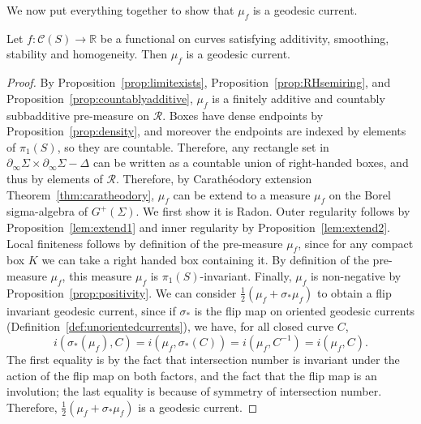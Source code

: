 We now put everything together to show that $\mu_f$ is a geodesic current.

\begin{proposition}
Let $f \colon \mathcal{C}(S) \to \mathbb{R}$ be a functional on curves satisfying additivity, smoothing, stability and homogeneity.
Then $\mu_f$ is a geodesic current.
\end{proposition}
\begin{proof}
By Proposition~\ref{prop:limitexists}, Proposition~\ref{prop:RHsemiring}, and Proposition~\ref{prop:countablyadditive}, $\mu_f$ is a finitely additive and countably subbadditive pre-measure on $\mathcal{R}$. Boxes have dense endpoints by Proposition~\ref{prop:density}, and moreover the endpoints are indexed by elements of $\pi_1(S)$, so they are countable. Therefore, any rectangle set in $\partial_{\infty}\Sigma \times \partial_{\infty} \Sigma-\Delta$ can be written as a countable union of right-handed boxes, and thus by elements of $\mathcal{R}$.
Therefore, by Carathéodory extension Theorem~\ref{thm:caratheodory}, $\mu_f$ can be extend to a measure $\mu_f$ on the Borel sigma-algebra of $G^+(\Sigma)$.
We first show it is Radon. 
Outer regularity follows by Proposition~\ref{lem:extend1} and inner regularity by Proposition~\ref{lem:extend2}.
Local finiteness follows by definition of the pre-measure $\mu_f$, since for any compact box $K$ we can take a right handed box containing it.
By definition of the pre-measure $\mu_f$, this measure $\mu_f$ is $\pi_1(S)$-invariant. Finally, $\mu_f$ is non-negative by Proposition~\ref{prop:positivity}.
We can consider $\frac{1}{2}(\mu_f + \sigma_{*} \mu_f)$ to obtain a flip invariant geodesic current, since if $\sigma_*$ is the flip map on oriented geodesic currents (Definition~\ref{def:unorientedcurrents}), we have, for all closed curve $C$,
\[
i(\sigma_*(\mu_f),C)=i(\mu_f,\sigma_*(C))=i(\mu_f,C^{-1})=i(\mu_f,C).
\]
The first equality is by the fact that intersection number is invariant under the action of the flip map on both factors, and the fact that the flip map is an involution; the last equality is because of symmetry of intersection number.
Therefore, $\frac{1}{2}(\mu_f + \sigma_{*} \mu_f)$ is a geodesic current.\qedhere
\end{proof}

